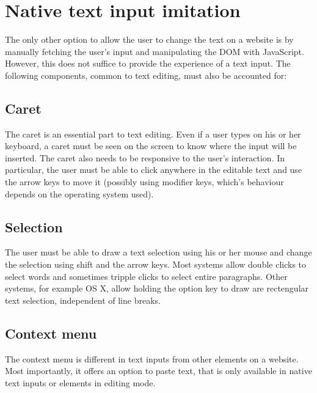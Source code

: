 \section{Native text input imitation} 
\label{subsec:concept_native_imitation}

The only other option to allow the user to change the text on a website is by manually fetching the user's input and manipulating the DOM with JavaScript. However, this does not suffice to provide the experience of a text input. The following components, common to text editing, must also be accounted for:



\subsection{Caret} 

The caret is an essential part to text editing. Even if a user types on his or her keyboard, a caret must be seen on the screen to know where the input will be inserted. The caret also needs to be responsive to the user's interaction. In particular, the user must be able to click anywhere in the editable text and use the arrow keys to move it (possibly using modifier keys, which's behaviour depends on the operating system used).

\subsection{Selection} 
The user must be able to draw a text selection using his or her mouse and change the selection using shift and the arrow keys. Most systems allow double clicks to select words and sometimes tripple clicks to select entire paragraphs. Other systems, for example OS X, allow holding the option key to draw are rectengular text selection, independent of line breaks.

\subsection{Context menu} The context menu is different in text inputs from other elements on a website. Most importantly, it offers an option to paste text, that is only available in native text inputs or elements in editing mode.

